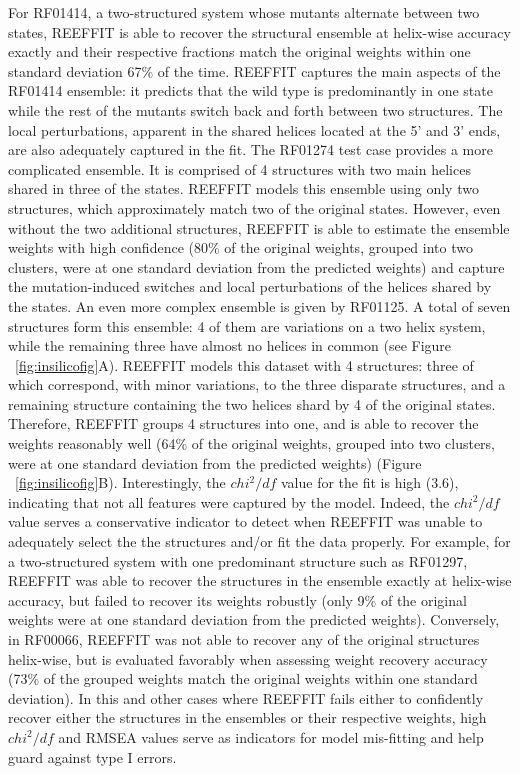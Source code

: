 \documentclass[12pt]{article}
\begin{document}
For RF01414, a two-structured system whose mutants alternate between two states, REEFFIT is able to recover the structural ensemble at helix-wise accuracy exactly and their respective fractions match the original weights within one standard deviation 67\% of the time.
REEFFIT captures the main aspects of the RF01414 ensemble: it predicts that the wild type is predominantly in one state while the rest of the mutants switch back and forth between two structures.
The local perturbations, apparent in the shared helices located at the 5' and 3' ends, are also adequately captured in the fit.
The RF01274 test case provides a more complicated ensemble. It is comprised of 4 structures with two main helices shared in three of the states. 
REEFFIT models this ensemble using only two structures, which approximately match two of the original states.
However, even without the two additional structures, REEFFIT is able to estimate the ensemble weights with high confidence (80\% of the original weights, grouped into two clusters, were at one standard deviation from the predicted weights) and capture the mutation-induced switches and local perturbations of the helices shared by the states.
An even more complex ensemble is given by RF01125. A total of seven structures form this ensemble: 4 of them are variations on a two helix system, while the remaining three have almost no helices in common (see Figure ~\ref{fig:insilicofig}A). 
REEFFIT models this dataset with 4 structures: three of which correspond, with minor variations, to the three disparate structures, and a remaining structure containing the two helices shard by 4 of the original states.
Therefore, REEFFIT groups 4 structures into one, and is able to recover the weights reasonably well (64\% of the original weights, grouped into two clusters, were at one standard deviation from the predicted weights) (Figure ~\ref{fig:insilicofig}B). 
Interestingly, the $chi^2/df$ value for the fit is high (3.6), indicating that not all features were captured by the model.
Indeed, the $chi^2/df$ value serves a conservative indicator to detect when REEFFIT was unable to adequately select the the structures and/or fit the data properly. 
For example, for a two-structured system with one predominant structure such as RF01297, REEFFIT was able to recover the structures in the ensemble exactly at helix-wise accuracy, but failed to recover its weights robustly (only 9\% of the original weights were at one standard deviation from the predicted weights). 
Conversely, in RF00066, REEFFIT was not able to recover any of the original structures helix-wise, but is evaluated favorably when assessing weight recovery accuracy (73\% of the grouped weights match the original weights within one standard deviation).
In this and other cases where REEFFIT fails either to confidently recover either the structures in the ensembles or their respective weights, high $chi^2/df$ and RMSEA values serve as indicators for model mis-fitting and help guard against type I errors.
\end{document}
